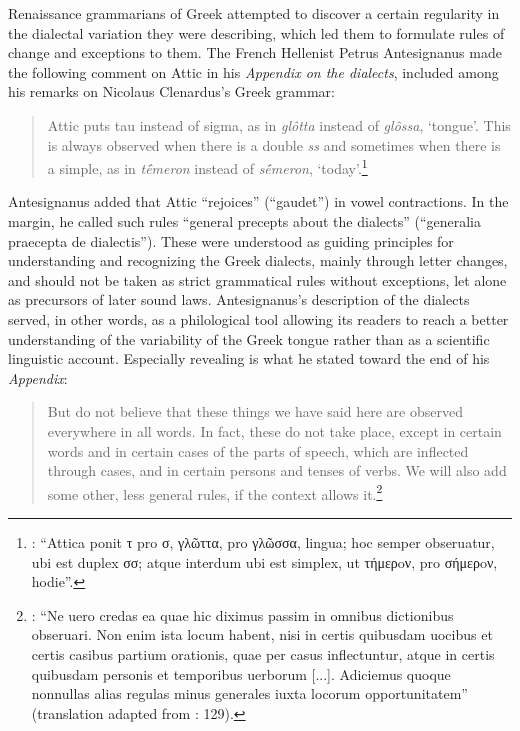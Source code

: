 Renaissance grammarians of Greek attempted to discover a certain regularity in the dialectal variation they were describing, which led them to formulate rules of change and exceptions to them. The French Hellenist Petrus Antesignanus made the following comment on Attic in his \textit{Appendix on the dialects}, included among his remarks on Nicolaus Clenardus’s Greek grammar:

\begin{quote}
Attic puts tau instead of sigma, as in \textit{glôtta} instead of \textit{glôssa}, `tongue'. This is always observed when there is a double \textit{ss} and sometimes when there is a simple, as in \textit{tḗmeron} instead of \textit{sḗmeron}, `today'.\footnote{{\citet[13]{Antesignanus1554}: “Attica ponit τ pro σ, γλῶττα, pro γλῶσσα, lingua; hoc semper obseruatur, ubi est duplex σσ; atque interdum ubi est simplex, ut τήμερoν, pro σήμερoν, hodie”.}}
\end{quote}

Antesignanus added that Attic “rejoices” (“gaudet”) in vowel contractions. In the margin, he called such rules “general precepts about the dialects” (“generalia praecepta de dialectis”). These were understood as guiding principles for understanding and recognizing the Greek dialects, mainly through letter changes, and should not be taken as strict grammatical rules without exceptions, let alone as precursors of later sound laws. Antesignanus’s description of the dialects served, in other words, as a philological tool allowing its readers to reach a better understanding of the variability of the Greek tongue rather than as a scientific linguistic account. Especially revealing is what he stated toward the end of his \textit{Appendix}:

\begin{quote}
But do not believe that these things we have said here are observed everywhere in all words. In fact, these do not take place, except in certain words and in certain cases of the parts of speech, which are inflected through cases, and in certain persons and tenses of verbs. We will also add some other, less general rules, if the context allows it.\footnote{{\citet[15]{Antesignanus1554}: “Ne uero credas ea quae hic diximus passim in omnibus dictionibus obseruari. Non enim ista locum habent, nisi in certis quibusdam uocibus et certis casibus partium orationis, quae per casus inflectuntur, atque in certis quibusdam personis et temporibus uerborum [...]. Adiciemus quoque nonnullas alias regulas minus generales iuxta locorum opportunitatem” (translation adapted from \citealt{VanRooy2016c}: 129).}}
\end{quote}

